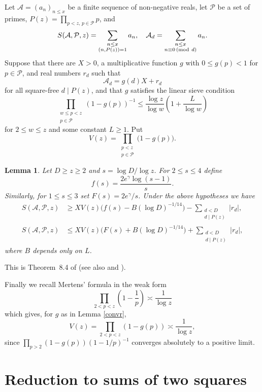 \documentclass[12pt]{amsart}
\newtheorem{lemma}{Lemma}
\theoremstyle{remark}
\renewcommand{\pmod}[1]{\mkern3mu(\mathrm{mod}\ #1)}
\begin{document}
Let $\mathcal A = (a_n)_{n \le x}$ be a finite sequence of non-negative reals, let $\mathcal P$ be a set of primes, $P(z) = \prod_{p < z,\, p \in \mathcal P}p$, and
\[
    S(\mathcal A, \mathcal P, z) = \sum_{\substack{n\le x\\ (n,P(z)) = 1}}a_n, \quad
    \mathcal A_d = \sum_{\substack{n\le x\\ n \equiv 0 \pmod  d}} a_n .
\]
Suppose that there are $X > 0$, a multiplicative function $g$ with $0 \le g(p) < 1$ for $p \in \mathcal P$, and real numbers $r_d$ such that
\[
    \mathcal A_d = g(d)X+r_d
\]
for all square-free $d \mid P(z)$, and that $g$ satisfies the linear sieve condition
\[
    \prod_{\substack{w\le p<z\\ p\in\mathcal P}}(1-g(p))^{-1}\le\frac{\log z}{\log w}\left(1+\frac{L}{\log w}\right)
\]
for $2 \le w \le z$ and some constant $L \ge 1$. 
Put 
\[
    V(z) = \prod_{\substack{p < z \\ p \in \mathcal P}} \bigl(1-g(p)\bigr).
\]

\begin{lemma} \label{linear-sieve-lem}
    Let $D \ge z \ge 2$ and $s = \log D/\log z$. 
    For $2 \le s \le 4$ define
    \[
        f(s)=\frac{2e^{\gamma}\log(s-1)}{s}.
    \]
    Similarly, for $1 \le s \le 3$ set $F(s) = 2e^{\gamma}/{s}$.
    Under the above hypotheses we have
    \[
        \begin{split}
            S(\mathcal A,\mathcal P,z) &\ge XV(z)\big(f(s) - B(\log D)^{-1/14}\big) - \sum_{\substack{d < D\\ d\mid P(z)}}|r_d|,\\
            S(\mathcal A,\mathcal P,z) &\le XV(z)\big(F(s) + B(\log D)^{-1/14}\big) + \sum_{\substack{d < D\\ d\mid P(z)}}|r_d|,
        \end{split}
    \]
    where $B$ depends only on $L$.
\end{lemma}

This is Theorem~8.4 of \cite{MR424730} (see also \cite{MR202680} and \cite[Theorem 9.7]{MR1477155}).

Finally we recall Mertens' formula in the weak form
\[
    \prod_{2<p<z}\left(1-\frac1p\right)\asymp\frac {1}{\log z}
\]
which gives, for $g$ as in Lemma \ref{convr},
\[
    V(z) = \prod_{2 < p < z}(1-g(p)) \asymp \frac{1}{\log z},
\]
since $\prod_{p>2}(1-g(p))(1-1/p)^{-1}$ converges absolutely to a positive limit.
\section{Reduction to sums of two squares}\label{initial-reduction}
\end{document}
